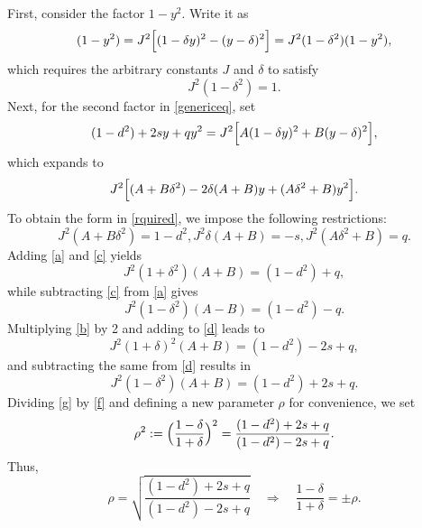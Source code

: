\documentclass[12pt,oneside]{report}
\theoremstyle{definition}
\begin{document}
\noindent First, consider the factor \(1-y^{2}\). Write it as
\[
(1-y^{2}) = J^{2}\Bigl[(1-\delta y)^{2} - (y-\delta)^{2}\Bigr] = J^{2}(1-\delta^{2})(1-y^{2}),
\]
which requires the arbitrary constants \(J\) and \(\delta\) to satisfy
\begin{equation}\label{7.2}
J^{2}(1-\delta^{2}) = 1.
\end{equation}
Next, for the second factor in \autoref{genericeq}, set
\[
(1-d^{2}) + 2sy + qy^{2} = J^{2}\Bigl[A(1-\delta y)^{2} + B(y-\delta)^{2}\Bigr],
\]
which expands to
\[
J^{2}\Bigl[(A+B\delta^{2}) - 2\delta(A+B)y + (A\delta^{2}+B)y^{2}\Bigr].
\]
To obtain the form in \autoref{rquired}, we impose the following restrictions:
\begin{subequations}
    \begin{equation}\label{a}
    J^{2}(A+B\delta^{2}) = 1-d^{2},
    \end{equation}
    \begin{equation}\label{b}
    J^{2}\delta(A+B) = -s,
    \end{equation}
    \begin{equation}\label{c}
    J^{2}(A\delta^{2}+B) = q.
    \end{equation}
\end{subequations}
Adding \autoref{a} and \autoref{c} yields
\begin{equation}\label{d}
J^{2}(1+\delta^{2})(A+B) = (1-d^{2})+q,
\end{equation}
while subtracting \autoref{c} from \autoref{a} gives
\begin{equation}\label{e}
J^{2}(1-\delta^{2})(A-B) = (1-d^{2})-q.
\end{equation}
Multiplying \autoref{b} by 2 and adding to \autoref{d} leads to
\begin{equation}\label{f}
J^{2}(1+\delta)^{2}(A+B) = (1-d^{2})-2s+q,
\end{equation}
and subtracting the same from \autoref{d} results in
\begin{equation}\label{g}
J^{2}(1-\delta^{2})(A+B) = (1-d^{2})+2s+q.
\end{equation}
Dividing \autoref{g} by \autoref{f} and defining a new parameter \(\rho\) for convenience, we set
\begin{equation}\label{h}
\rho^{2} := \Bigl(\frac{1-\delta}{1+\delta}\Bigr)^{2} = \frac{(1-d^{2})+2s+q}{(1-d^{2})-2s+q}.
\end{equation}
Thus,
\begin{equation}\label{ij}
\rho = \sqrt{\frac{(1-d^{2})+2s+q}{(1-d^{2})-2s+q}} \quad \Longrightarrow \quad \frac{1-\delta}{1+\delta} = \pm \rho.
\end{equation}
\end{document}
